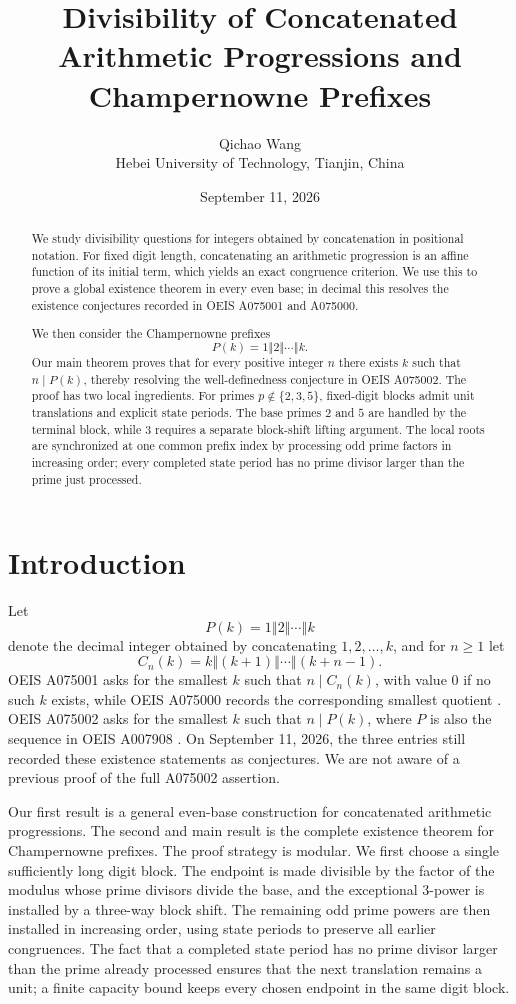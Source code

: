 \documentclass[11pt]{amsart}
\title[Divisibility of concatenations]{Divisibility of Concatenated Arithmetic Progressions and Champernowne Prefixes}
\author[Qichao Wang]{Qichao Wang\\
  \textnormal{\footnotesize Hebei University of Technology, Tianjin, China}}
\date{September 11, 2026}
\theoremstyle{remark}
\newcommand{\concat}{\mathbin{\Vert}}
\begin{document}
\begin{abstract}
We study divisibility questions for integers obtained by concatenation in positional notation.
For fixed digit length, concatenating an arithmetic progression is an affine function of its
initial term, which yields an exact congruence criterion.  We use this to prove a global
existence theorem in every even base; in decimal this resolves the existence conjectures
recorded in OEIS A075001 and A075000.

We then consider the Champernowne prefixes
\[
P(k)=1\concat2\concat\cdots\concat k.
\]
Our main theorem proves that for every positive integer \(n\) there exists \(k\) such that
\(n\mid P(k)\), thereby resolving the well-definedness conjecture in OEIS A075002.  The
proof has two local ingredients.  For primes \(p\notin\{2,3,5\}\), fixed-digit blocks
admit unit translations and explicit state periods.  The base primes \(2\) and \(5\) are
handled by the terminal block, while \(3\) requires a separate block-shift lifting argument.
The local roots are synchronized at one common prefix index by processing odd prime factors
in increasing order; every completed state period has no prime divisor larger than the prime
just processed.
\end{abstract}

\maketitle

\section{Introduction}

Let
\[
P(k)=1\concat2\concat\cdots\concat k
\]
denote the decimal integer obtained by concatenating \(1,2,\ldots,k\), and for \(n\ge1\) let
\[
C_n(k)=k\concat(k+1)\concat\cdots\concat(k+n-1).
\]
OEIS A075001 asks for the smallest \(k\) such that \(n\mid C_n(k)\), with value \(0\)
if no such \(k\) exists, while OEIS A075000 records the corresponding smallest quotient
\cite{oeis75001,oeis75000}.  OEIS A075002 asks for the smallest \(k\) such that
\(n\mid P(k)\), where \(P\) is also the sequence in OEIS A007908
\cite{oeis75002,oeis77908}.  On September 11, 2026, the three entries still recorded
these existence statements as conjectures.  We are not aware of a previous proof of the
full A075002 assertion.

Our first result is a general even-base construction for concatenated arithmetic progressions.
The second and main result is the complete existence theorem for Champernowne prefixes.
The proof strategy is modular.  We first choose a single sufficiently long digit block.  The
endpoint is made divisible by the factor of the modulus whose prime divisors divide the base, and the exceptional
\(3\)-power is installed by a three-way block shift.  The remaining odd prime powers are then
installed in increasing order, using state periods to preserve all earlier congruences.  The
fact that a completed state period has no prime divisor larger than the prime already processed
ensures that the next translation remains a unit; a finite capacity bound keeps every chosen
endpoint in the same digit block.
\end{document}
